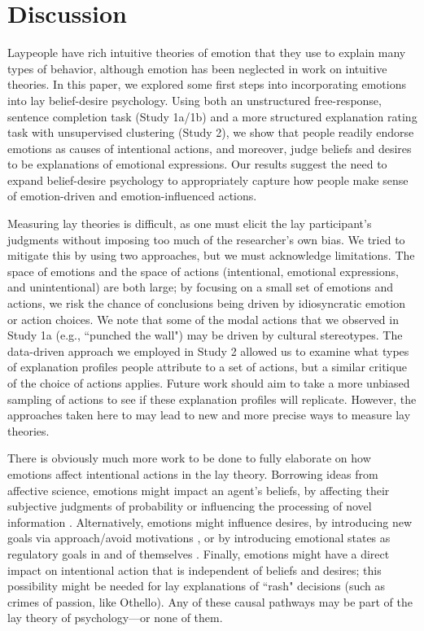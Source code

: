 \documentclass[10pt,letterpaper]{article}
\begin{document}
\section{Discussion}

Laypeople have rich intuitive theories of emotion that they use to explain many types of behavior, although emotion has been neglected in work on intuitive theories. In this paper, we explored some first steps into incorporating emotions into lay belief-desire psychology. Using both an unstructured free-response, sentence completion task (Study 1a/1b) and a more structured explanation rating task with unsupervised clustering (Study 2), we show that people readily endorse emotions as causes of intentional actions, and moreover, judge beliefs and desires to be explanations of emotional expressions. Our results suggest the need to expand belief-desire psychology to appropriately capture how people make sense of emotion-driven and emotion-influenced actions.

Measuring lay theories is difficult, as one must elicit the lay participant's judgments without imposing too much of the researcher's own bias. We tried to mitigate this by using two approaches, but we must acknowledge limitations. The space of emotions and the space of actions (intentional, emotional expressions, and unintentional) are both large; by focusing on a small set of emotions and actions, we risk the chance of conclusions being driven by idiosyncratic emotion or action choices. We note that some of the modal actions that we observed in Study 1a (e.g., ``punched the wall") may be driven by cultural stereotypes. The data-driven approach we employed in Study 2 allowed us to examine what types of explanation profiles people attribute to a set of actions, but a similar critique of the choice of actions applies. Future work should aim to take a more unbiased sampling of actions to see if these explanation profiles will replicate. However, the approaches taken here to may lead to new and more precise ways to measure lay theories.

There is obviously much more work to be done to fully elaborate on how emotions affect intentional actions in the lay theory. Borrowing ideas from affective science, emotions might impact an agent's beliefs, by affecting their subjective judgments of probability \cite{Wright1992} or influencing the processing of novel information \cite{Forgas1995}. Alternatively, emotions might influence desires, by introducing new goals via approach/avoid motivations \cite{Carver2004}, or by introducing emotional states as regulatory goals in and of themselves \cite{Gross2006}. Finally, emotions might have a direct impact on intentional action that is independent of beliefs and desires; this possibility might be needed for lay explanations of ``rash" decisions (such as crimes of passion, like Othello). 
Any of these causal pathways may be part of the lay theory of psychology---or none of them.
\end{document}
